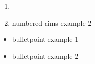 \begin{enumerate}
\item 
\item numbered aims example 2
\end{enumerate}

\begin{itemize}
\item bulletpoint example 1
\item bulletpoint example 2
\end{itemize}
